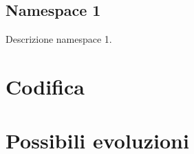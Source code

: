 \subsection*{Namespace 1}
Descrizione namespace 1.

\begin{namespacedesc}
\end{namespacedesc}

\section{Codifica}

\section{Possibili evoluzioni}
